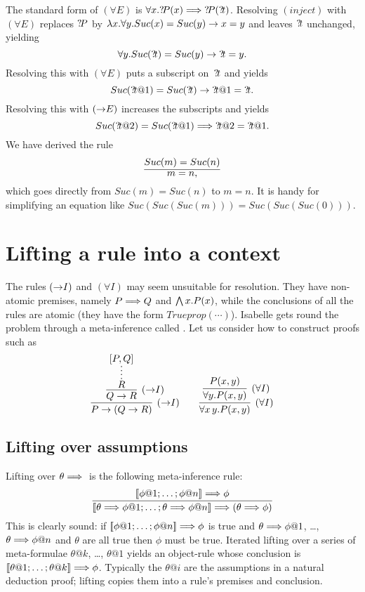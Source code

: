 \noindent
The standard form of $(\forall E)$ is
$\forall x.{?\!P}(x)  \Longrightarrow {?\!P}({?\!t})$.
Resolving $(inject)$ with $(\forall E)$ replaces ${?\!P}$ by
$\lambda x. \forall y. Suc(x)=Suc(y)\rightarrow x=y$ and leaves ${?\!t}$
unchanged, yielding
\[ \forall y. Suc({?\!t})=Suc(y)\rightarrow {?\!t}=y. \]
Resolving this with $(\forall E)$ puts a subscript on~${?\!t}$
and yields
\[ Suc({?\!t@1})=Suc({?\!t})\rightarrow {?\!t@1}={?\!t}. \]
Resolving this with $({\rightarrow}E)$ increases the subscripts and yields
\[ Suc({?\!t@2})=Suc({?\!t@1})\Longrightarrow {?\!t@2}={?\!t@1}.
\]
We have derived the rule
\[ \infer{m=n,}{Suc(m)=Suc(n)} \]
which goes directly from $Suc(m)=Suc(n)$ to $m=n$. It is handy for simplifying
an equation like $Suc(Suc(Suc(m)))=Suc(Suc(Suc(0)))$.


\section{Lifting a rule into a context}
The rules $({\rightarrow}I)$ and $(\forall I)$ may seem unsuitable for
resolution. They have non-atomic premises, namely $P\Longrightarrow Q$ and $\bigwedge
x.P(x)$, while the conclusions of all the rules are atomic (they have the form
$Trueprop(\cdots)$). Isabelle gets round the problem through a meta-inference
called . Let us consider how to construct proofs such as
\[ \infer[({\imp}I)]{P\imp(Q\imp R)}
{\infer[({\imp}I)]{Q\imp R}
{\infer*{R}{[P,Q]}}}
\qquad
\infer[(\forall I)]{\forall x\,y.P(x,y)}
{\infer[(\forall I)]{\forall y.P(x,y)}{P(x,y)}}
\]

\subsection{Lifting over assumptions}
Lifting over $\theta\Longrightarrow{}$ is the following meta-inference rule:
\[ \infer{\List{\theta\Imp\phi@1; \ldots; \theta\Imp\phi@n} \Imp
(\theta \Imp \phi)}
{\List{\phi@1; \ldots; \phi@n} \Imp \phi} \]
This is clearly sound: if $\List{\phi@1; \ldots; \phi@n} \Imp \phi$ is true and
$\theta\Imp\phi@1$, \ldots, $\theta\Imp\phi@n$ and $\theta$ are all true then
$\phi$ must be true. Iterated lifting over a series of meta-formulae
$\theta@k$, \ldots, $\theta@1$ yields an object-rule whose conclusion is
$\List{\theta@1; \ldots; \theta@k} \Imp \phi$. Typically the $\theta@i$ are
the assumptions in a natural deduction proof; lifting copies them into a rule's
premises and conclusion.

